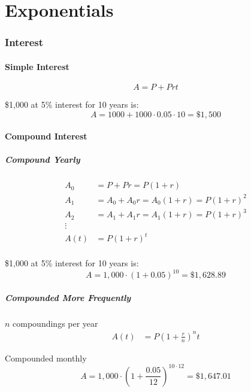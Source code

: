 \documentclass[letterpaper, portrait]{exam}
\begin{document}
  \part{Exponentials} %
  
  \section{Interest}

  \subsection{Simple Interest} %
  \[
    A = P + Prt
  \]

  \$1,000 at 5\% interest for 10 years is:
  \[
    A = 1000 + 1000 \cdot 0.05 \cdot 10 = \$1,500
  \]

  \subsection{Compound Interest} %

  \subsubsection{Compound Yearly} %
  \begin{align*}
    A_0 &= P + Pr = P(1 + r) \\
    A_1 &= A_0 + A_0 r = A_0 (1 + r) = P(1 + r)^2 \\
    A_2 &= A_1 + A_1 r = A_1 (1 + r) = P(1 + r)^3 \\
    \vdots \\
    A(t) &= P(1 + r)^t \\
  \end{align*}
  
  \$1,000 at 5\% interest for 10 years is:
  \[
    A = 1,000 \cdot (1 + 0.05)^{10} = \$1,628.89
  \]

  \subsubsection{Compounded More Frequently} %

  $n$ compoundings per year
  \begin{align*}
    A(t) &= P \left(1 + \frac{r}{n} \right)^nt
  \end{align*}
  
  Compounded monthly
  \[
    A = 1,000 \cdot \left( 1 + \frac{0.05}{12} \right)^{10 \cdot 12} = \$1,647.01
  \]
\end{document}
